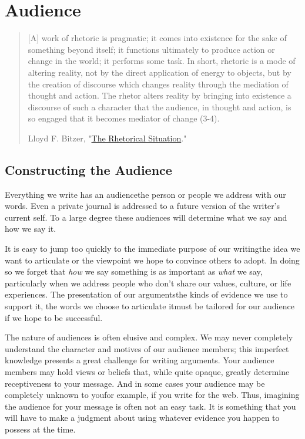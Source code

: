 \hypertarget{audience}{}

\chapter{Audience}

\begin{quote} \small [A] work of rhetoric is pragmatic; it comes into existence
for the sake of something beyond itself; it functions ultimately to produce
action or change in the world; it performs some task. In short, rhetoric is a
mode of altering reality, not by the direct application of energy to objects,
but by the creation of discourse which changes reality through the mediation of
thought and action. The rhetor alters reality by bringing into existence a
discourse of such a character that the audience, in thought and action, is so
engaged that it becomes mediator of change (3-4).

\textemdash Lloyd F. Bitzer, "\href{http://www.jstor.org/stable/40593346}{The
Rhetorical Situation}." \end{quote}

\section{Constructing the Audience}

Everything we write has an audience\textemdash the person or people we address
with our words. Even a private journal is addressed to a future version of the
writer's current self. To a large degree these audiences will determine what we say and how we say it.

It is easy to jump too quickly to the immediate purpose of our
writing\textemdash the idea we want to articulate or the viewpoint we hope to
convince others to adopt. In doing so we forget that \emph{how} we say
something is as important as \emph{what} we say, particularly when we address
people who don't share our values, culture, or life experiences. The presentation of our
arguments\textemdash the kinds of evidence we use to support it, the words we
choose to articulate it\textemdash must be tailored for our audience if we hope
to be successful.

The nature of audiences is often elusive and complex. We may never completely understand the character and motives of our audience members; this imperfect knowledge presents a great challenge for writing arguments. Your audience members may hold views or beliefs that, while quite opaque, greatly determine receptiveness to your message. And in some cases your audience may be completely unknown to you\textemdash for example, if you write for the web. Thus, imagining the audience for your message is often not an easy task. It is something that you will have to make a judgment about using whatever evidence you happen to possess at the time. 

